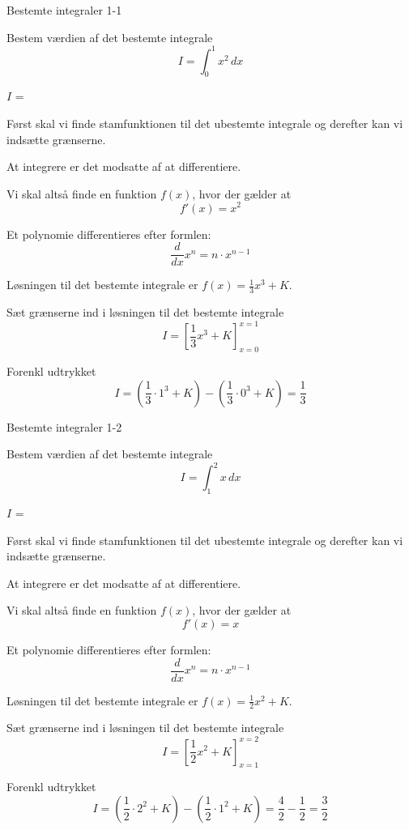\documentclass{article}
\begin{document}
\tableofcontents

\begin{exercise}{Bestemte integraler 1-1}

Bestem værdien af det bestemte integrale
\[
I = \int_0^1 x^2 \, dx
\]

$I$ = 


\hint
Først skal vi finde stamfunktionen til det ubestemte integrale og derefter kan vi indsætte grænserne.

\hint
At integrere er det modsatte af at differentiere.

\hint
Vi skal altså finde en funktion $f(x)$, hvor der gælder at
\[
f'(x) = x^2
\]

\hint
Et polynomie differentieres efter formlen:
\[
\frac{d}{dx} x^n = n \cdot x^{n - 1}
\]

\hint
Løsningen til det bestemte integrale er $f(x) = \frac{1}{3} x^3 + K$.

\hint
Sæt grænserne ind i løsningen til det bestemte integrale
\[
I = \left[ \frac{1}{3} x^3 + K \right]_{x=0}^{x=1}
\]

\hint
Forenkl udtrykket
\[
I = \left( \frac{1}{3} \cdot 1^3 + K \right) - \left( \frac{1}{3} \cdot 0^3 + K \right) = \frac{1}{3}
\]


\end{exercise}

\newpage

\begin{exercise}{Bestemte integraler 1-2}

Bestem værdien af det bestemte integrale
\[
I = \int_1^2 x \, dx
\]

$I$ = 


\hint
Først skal vi finde stamfunktionen til det ubestemte integrale og derefter kan vi indsætte grænserne.

\hint
At integrere er det modsatte af at differentiere.

\hint
Vi skal altså finde en funktion $f(x)$, hvor der gælder at
\[
f'(x) = x
\]

\hint
Et polynomie differentieres efter formlen:
\[
\frac{d}{dx} x^n = n \cdot x^{n - 1}
\]

\hint
Løsningen til det bestemte integrale er $f(x) = \frac{1}{2} x^2 + K$.

\hint
Sæt grænserne ind i løsningen til det bestemte integrale
\[
I = \left[ \frac{1}{2} x^2 + K \right]_{x=1}^{x=2}
\]

\hint
Forenkl udtrykket
\[
I = \left( \frac{1}{2} \cdot 2^2 + K \right) - \left( \frac{1}{2} \cdot 1^2 + K \right) = \frac{4}{2} - \frac{1}{2}= \frac{3}{2}
\]


\end{exercise}
\end{document}
